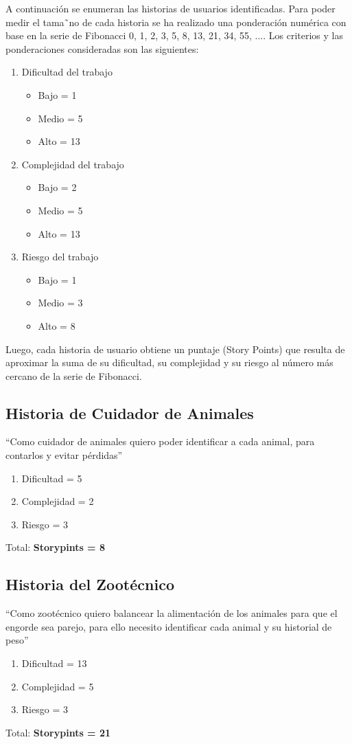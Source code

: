 \documentclass[
11pt, %
]{charter}
\begin{document}
A continuación se enumeran las historias de usuarios identificadas. Para poder medir el tama˜no de cada historia se ha realizado una ponderación numérica con base en la serie de Fibonacci 0,
1, 2, 3, 5, 8, 13, 21, 34, 55, .... Los criterios y las ponderaciones consideradas son las siguientes:
\begin{enumerate}
\item Dificultad del trabajo
      \begin{itemize}
      \item Bajo = 1
      \item Medio = 5
      \item Alto = 13
      \end{itemize}
\item Complejidad del trabajo
      \begin{itemize}
      \item Bajo = 2
      \item Medio = 5
      \item Alto = 13
      \end{itemize}
\item Riesgo del trabajo
      \begin{itemize}
      \item Bajo = 1
      \item Medio = 3
      \item Alto = 8
      \end{itemize}
\end{enumerate}
Luego, cada historia de usuario obtiene un puntaje (Story Points) que resulta de aproximar la suma de su dificultad, su complejidad y su riesgo al número más cercano de la serie de Fibonacci.

\subsection{Historia de Cuidador de Animales}

``Como cuidador de animales quiero poder identificar a cada animal, para contarlos y evitar pérdidas''
\begin{enumerate}
      \item Dificultad = 5
      \item Complejidad = 2
      \item Riesgo = 3
\end{enumerate}
 Total: \textbf{Storypints = 8}

\subsection{Historia del Zootécnico} 
``Como zootécnico quiero balancear la alimentación de los animales para que el engorde sea parejo, para ello necesito identificar cada animal y su historial de peso''
\begin{enumerate}
      \item Dificultad = 13
      \item Complejidad = 5
      \item Riesgo = 3
\end{enumerate}
 Total: \textbf{Storypints = 21 }
 
\end{document}
